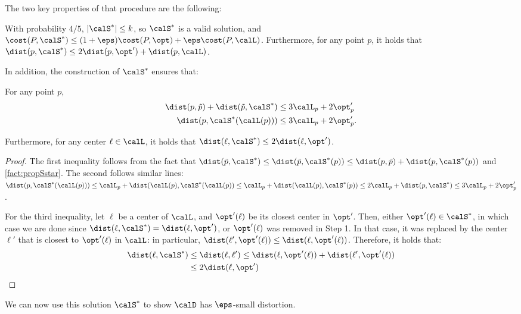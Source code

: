 The two key properties of that procedure are the following:
\begin{fact}\label{fact:propSstar}
With probability $4/5$, $|\calS^*| \leq k$, so $\calS^*$ is a valid solution, and $\cost(P,  \calS^*) \leq (1+\eps)\cost(P, \opt) + \eps \cost(P, \calL)$.
 Furthermore, for any point $p$,
  it holds that $\dist(p, \calS^*) \leq 2\dist(p, \opt') + \dist(p, \calL)$.  
\end{fact}
In addition, the construction of $\calS^*$ ensures that:
\begin{fact}\label{fact:ineq}
For any point $p$,
\begin{align*}
\dist(p, \tilde p) + \dist(\tilde p, \calS^*) &\leq 3\calL_p + 2\opt'_p\\
\dist(p, \calS^*(\calL(p))) &\leq 3\calL_p + 2\opt'_p.
\end{align*}

Furthermore, for any center $\ell \in \calL$, it holds that $\dist(\ell, \calS^*) \leq 2\dist(\ell, \opt')$.
\end{fact}
\begin{proof}
The first inequality follows from the fact that $\dist(\tilde p, \calS^*) \leq \dist(\tilde p, \calS^*(p)) \leq \dist(p, \tilde p) + \dist(p, \calS^*(p))$ and \cref{fact:propSstar}. 
The second follows similar lines: 
$\dist(p, \calS^*(\calL(p))) \leq \calL_p + \dist(\calL(p), \calS^*(\calL(p)) \leq \calL_p + \dist(\calL(p), \calS^*(p)) \leq 2\calL_p + \dist(p, \calS^*) \leq 3\calL_p + 2\opt'_p$.

For the third inequality, let $\ell$ be a center of $\calL$, and $\opt'(\ell)$ be its closest center in $\opt'$. Then, either $\opt'(\ell) \in \calS^*$, in which case we are done since $\dist(\ell, \calS^*) = \dist(\ell, \opt')$, or $\opt'(\ell)$ was removed in Step 1. 
In that case, it was replaced by the center $\ell'$ that is closest to $\opt'(\ell)$ in $\calL$: in particular, $\dist(\ell', \opt'(\ell)) \leq \dist(\ell, \opt'(\ell))$. Therefore, it holds that:
\begin{align*}
    \dist(\ell, \calS^*) &\leq \dist(\ell, \ell') \leq \dist(\ell, \opt'(\ell)) + \dist(\ell', \opt'(\ell)) 
    \\ &\leq 2\dist(\ell, \opt')\qedhere
\end{align*}
\end{proof}

We can now use this solution $ \calS^*$ to show $\calD$ has $\eps$-small distortion. 

